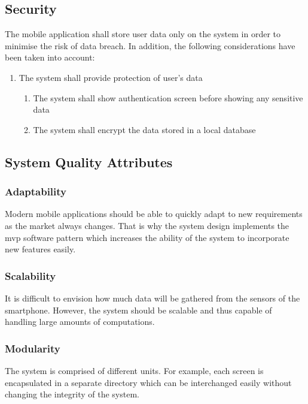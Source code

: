     \subsection{Security}
    The mobile application shall store user data only on the system in order to minimise the risk of data breach. In addition, the following considerations have been taken into account:
    
    \begin{enumerate}
        \item The system shall provide protection of user's data
            \begin{enumerate}
                \item The system shall show authentication screen before showing any sensitive data
                \item The system shall encrypt the data stored in a local database
            \end{enumerate}
    \end{enumerate}
    
    \subsection{System Quality Attributes}
        
        \subsubsection{Adaptability}
        Modern mobile applications should be able to quickly adapt to new requirements as the market always changes. That is why the system design implements the \gls{mvp} software pattern which increases the ability of the system to incorporate new features easily.
        
        \subsubsection{Scalability}
        It is difficult to envision how much data will be gathered from the sensors of the smartphone. However, the system should be scalable and thus capable of handling large amounts of computations.
        
        \subsubsection{Modularity}
        The system is comprised of different units. For example, each screen is encapsulated in a separate directory which can be interchanged easily without changing the integrity of the system.  
        
